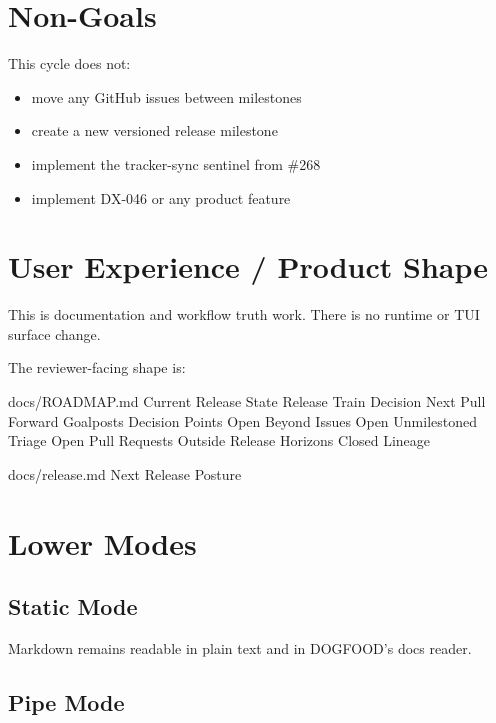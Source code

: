 \section{Non-Goals}\label{record-213-non-goals}

This cycle does not:

\begin{itemize}
\tightlist
\item
  move any GitHub issues between milestones
\item
  create a new versioned release milestone
\item
  implement the tracker-sync sentinel from \#268
\item
  implement DX-046 or any product feature
\end{itemize}

\section{User Experience / Product Shape}\label{record-213-user-experience-product-shape}

This is documentation and workflow truth work. There is no runtime or TUI surface change.

The reviewer-facing shape is:

\begin{CodeBlock}
docs/ROADMAP.md
  Current Release State
  Release Train Decision
  Next Pull
  Forward Goalposts
  Decision Points
  Open Beyond Issues
  Open Unmilestoned Triage
  Open Pull Requests Outside Release Horizons
  Closed Lineage

docs/release.md
  Next Release Posture
\end{CodeBlock}

\section{Lower Modes}\label{record-213-lower-modes}

\subsection{Static Mode}\label{record-213-static-mode}

Markdown remains readable in plain text and in DOGFOOD's docs reader.

\subsection{Pipe Mode}\label{record-213-pipe-mode}

